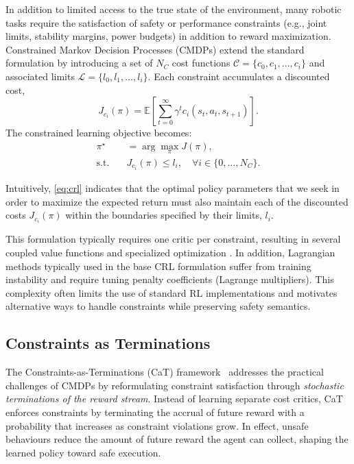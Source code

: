 In addition to limited access to the true state of the environment, many robotic tasks require the satisfaction of safety or performance constraints (e.g., joint limits, stability margins, power budgets) in addition to reward maximization. Constrained Markov Decision Processes (CMDPs) \citep{achiam2017constrained} extend the standard formulation by introducing a set of $N_C$ cost functions $\mathcal{C}=\{c_0, c_1, ...,c_i\}$ and associated limits $\mathcal{L}=\{l_0, l_1, ...,l_i\}$. Each constraint accumulates a discounted cost,
%
\begin{equation}
    J_{c_i}(\pi) = \mathbb{E}\!\left[\sum_{t=0}^{\infty}\gamma^{t} c_i(s_t, a_t, s_{t+1})\right].
\end{equation}
%
The constrained learning objective becomes:
%
\begin{equation}\label{eq:crl}
\begin{aligned}
    \pi^\star &= \arg\max_{\pi} J(\pi), \\
    \text{s.t.}\quad & J_{c_i}(\pi) \le l_i, \quad \forall i\in\{0,\dots,N_C\}.
\end{aligned}
\end{equation}

Intuitively, \cref{eq:crl} indicates that the optimal policy parameters that we seek in order to maximize the expected return must also maintain each of the discounted costs $J_{c_i}(\pi)$ within the boundaries specified by their limits, $l_i$.

This formulation typically requires one critic per constraint, resulting in several coupled value functions and specialized optimization \citep{LeeCRL}. In addition, Lagrangian methods typically used in the base CRL formulation suffer from training instability and require tuning penalty coefficients (Lagrange multipliers). This complexity often limits the use of standard RL implementations and motivates alternative ways to handle constraints while preserving safety semantics.

\subsection{Constraints as Terminations}
\label{sec:cat}

The Constraints-as-Terminations (CaT) framework~\citep{chane2024cat} addresses the
practical challenges of CMDPs by reformulating constraint satisfaction through
\emph{stochastic terminations of the reward stream}. Instead of learning separate cost
critics, CaT enforces constraints by terminating the accrual of future reward with a
probability that increases as constraint violations grow. In effect, unsafe behaviours reduce the amount of future reward the agent can collect, shaping the learned policy toward safe execution.

